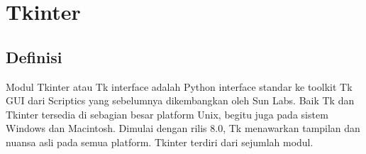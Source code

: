 \section {Tkinter}

\subsection{Definisi}
Modul Tkinter atau Tk interface adalah Python interface standar ke toolkit Tk GUI dari Scriptics yang sebelumnya dikembangkan oleh Sun Labs. Baik Tk dan Tkinter tersedia di sebagian besar platform Unix, begitu juga pada sistem Windows dan Macintosh. Dimulai dengan rilis 8.0, Tk menawarkan tampilan dan nuansa asli pada semua platform. Tkinter terdiri dari sejumlah modul.